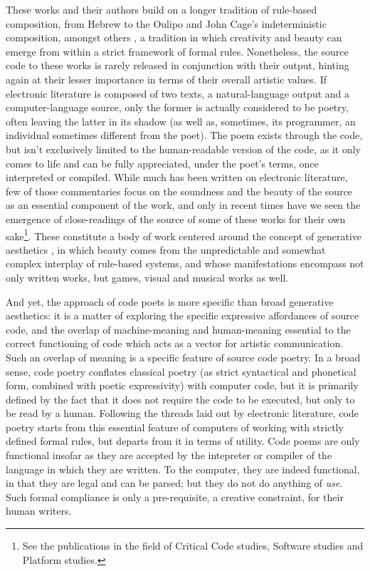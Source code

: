 These works and their authors build on a longer tradition of rule-based composition, from Hebrew to the Oulipo and John Cage's indeterministic composition, amongst others \citep{cramer_words_2003}, a tradition in which creativity and beauty can emerge from within a strict framework of formal rules. Nonetheless, the source code to these works is rarely released in conjunction with their output, hinting again at their lesser importance in terms of their overall artistic values. If electronic literature is composed of two texts, a natural-language output and a computer-language source, only the former is actually considered to be poetry, often leaving the latter in its shadow (as well as, sometimes, its programmer, an individual sometimes different from the poet). The poem exists through the code, but isn't exclusively limited to the human-readable version of the code, as it only comes to life and can be fully appreciated, under the poet's terms, once interpreted or compiled. While much has been written on electronic literature, few of those commentaries focus on the soundness and the beauty of the source as an essential component of the work, and only in recent times have we seen the emergence of close-readings of the source of some of these works for their own sake\footnote{See the publications in the field of Critical Code studies, Software studies and Platform studies.}. These constitute a body of work centered around the concept of generative aesthetics \citep{goriunova_read_2005}, in which beauty comes from the unpredictable and somewhat complex interplay of rule-based systems, and whose manifestations encompass not only written works, but games, visual and musical works as well.

And yet, the approach of code poets is more specific than broad generative aesthetics: it is a matter of exploring the specific expressive affordances of source code, and the overlap of machine-meaning and human-meaning essential to the correct functioning of code which acts as a vector for artistic communication. Such an overlap of meaning is a specific feature of source code poetry. In a broad sense, code poetry conflates classical poetry (as strict syntactical and phonetical form, combined with poetic expressivity) with computer code, but it is primarily defined by the fact that it does not require the code to be executed, but only to be read by a human. Following the threads laid out by electronic literature, code poetry starts from this essential feature of computers of working with strictly defined formal rules, but departs from it in terms of utility. Code poems are only functional insofar as they are accepted by the intepreter or compiler of the language in which they are written. To the computer, they are indeed functional, in that they are legal and can be parsed; but they do not do anything of \emph{use}. Such formal compliance is only a pre-requisite, a creative constraint, for their human writers.

